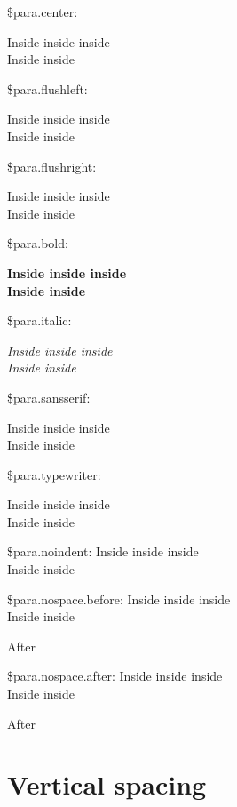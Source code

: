\documentclass[ebook,demo]{pyscribe}
\begin{document}
\par\$para.center: \par{\centering
Inside inside inside \\ Inside inside\par}
\par\$para.flushleft: \par{\raggedright
Inside inside inside \\ Inside inside\par}
\par\$para.flushright: \par{\raggedleft
Inside inside inside \\ Inside inside\par}
\par\$para.bold: \par{\bfseries
Inside inside inside \\ Inside inside\par}
\par\$para.italic: \par{\itshape
Inside inside inside \\ Inside inside\par}
\par\$para.sansserif: \par{\sf
Inside inside inside \\ Inside inside\par}
\par\$para.typewriter: \par{\ttfamily
Inside inside inside \\ Inside inside\par}
\par\$para.noindent: \noindent Inside inside inside \\ Inside inside
\par\$para.nospace.before: \vspace{-\parskip}Inside inside inside \\ Inside inside\par After \par
\par\$para.nospace.after: \vspace{-\parskip}Inside inside inside \\ Inside inside\par After \par

\section{Vertical spacing}
\end{document}
